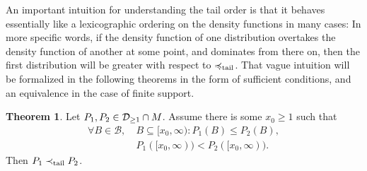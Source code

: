 \documentclass[a4paper]{scrreprt}
\newcommand{\B}{\mathcal{B}}
\newcommand{\M}{M}
\theoremstyle{definition}
\newtheorem{thm}{Theorem}[chapter] %
\begin{document}
    An important intuition for understanding the tail order is that it behaves essentially like a lexicographic ordering on the density functions in many cases: In more specific words, if the density function of one distribution overtakes the density function of another at some point, and dominates from there on, then the first distribution will be greater with respect to $\preccurlyeq_{\text{tail}}$.
    That vague intuition will be formalized in the following theorems in the form of sufficient conditions, and an equivalence in the case of finite support.
    
    \begin{thm}
        Let $P_1, P_2 \in \Dgeqone \cap \M$. Assume there is some $x_0 \geq 1$ such that
        \begin{align}
            \forall B \in \B, &~B \subseteq [x_0, \infty): P_1(B) \leq P_2(B)  \label{eq:p2DominatesP1LeftOfX0},  \\
            &~P_1([x_0, \infty)) < P_2([x_0, \infty)) \label{eq:p2StrictlyDominatesP1OnB0}.
        \end{align}
        Then $P_1 \prec_{\text{tail}} P_2$.
        \label{thm:tailOrderSufficientConditionsGeneral}
    \end{thm}    
\end{document}
